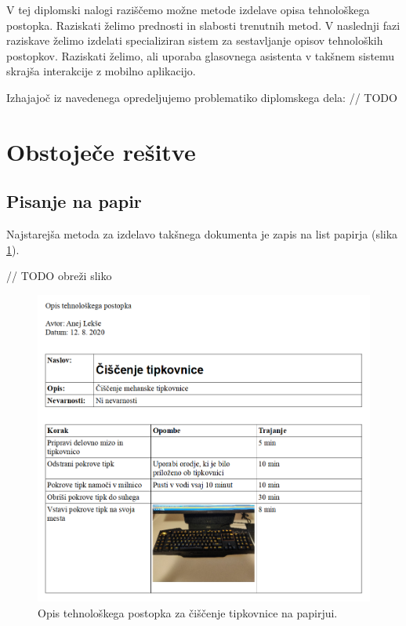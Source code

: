 \documentclass[a4paper, 12pt]{book}
\begin{document}
V tej diplomski nalogi raziščemo možne metode izdelave opisa tehnološkega postopka.
Raziskati želimo prednosti in slabosti trenutnih metod.
V naslednji fazi raziskave želimo izdelati specializiran sistem za sestavljanje opisov tehnoloških postopkov.
Raziskati želimo, ali uporaba glasovnega asistenta v takšnem sistemu skrajša interakcije z mobilno aplikacijo.

Izhajajoč iz navedenega opredeljujemo problematiko diplomskega dela: // TODO

\section{Obstoječe rešitve}

\subsection{Pisanje na papir}

Najstarejša metoda za izdelavo takšnega dokumenta je zapis na list papirja (slika \ref{paper}).

// TODO obreži sliko 
\begin{figure}[H]
\begin{center}
\includegraphics[width=13.5cm]{report_paper}
\end{center}
\caption{Opis tehnološkega postopka za čiščenje tipkovnice na papirjui.}
\label{paper}
\end{figure}
\end{document}
